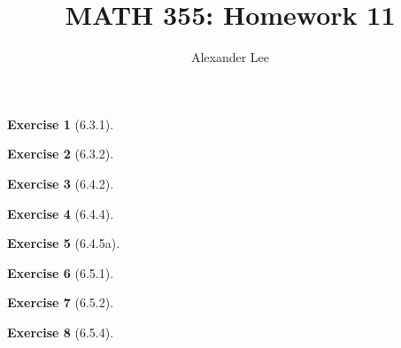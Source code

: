 \documentclass{amsart}
\title{MATH 355: Homework 11}
\author{Alexander Lee}
\theoremstyle{definition}
\newtheorem{exercise}{Exercise}
\begin{document}
\maketitle

\begin{exercise}[6.3.1]
\end{exercise}

\begin{exercise}[6.3.2]
\end{exercise}

\begin{exercise}[6.4.2]
\end{exercise}

\begin{exercise}[6.4.4]
\end{exercise}

\begin{exercise}[6.4.5a]
\end{exercise}

\begin{exercise}[6.5.1]
\end{exercise}

\begin{exercise}[6.5.2]
\end{exercise}

\begin{exercise}[6.5.4]
\end{exercise}
\end{document}

